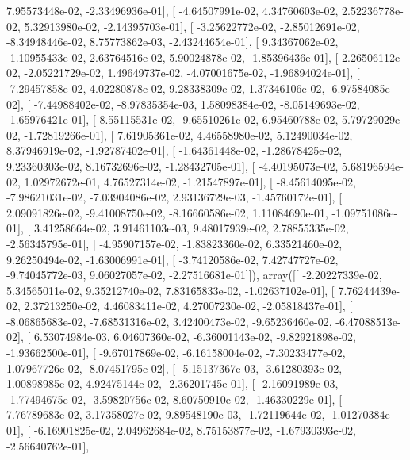 \documentclass{article}
\begin{document}
          7.95573448e-02,  -2.33496936e-01],
       [ -4.64507991e-02,   4.34760603e-02,   2.52236778e-02,
          5.32913980e-02,  -2.14395703e-01],
       [ -3.25622772e-02,  -2.85012691e-02,  -8.34948446e-02,
          8.75773862e-03,  -2.43244654e-01],
       [  9.34367062e-02,  -1.10955433e-02,   2.63764516e-02,
          5.90024878e-02,  -1.85396436e-01],
       [  2.26506112e-02,  -2.05221729e-02,   1.49649737e-02,
         -4.07001675e-02,  -1.96894024e-01],
       [ -7.29457858e-02,   4.02280878e-02,   9.28338309e-02,
          1.37346106e-02,  -6.97584085e-02],
       [ -7.44988402e-02,  -8.97835354e-03,   1.58098384e-02,
         -8.05149693e-02,  -1.65976421e-01],
       [  8.55115531e-02,  -9.65510261e-02,   6.95460788e-02,
          5.79729029e-02,  -1.72819266e-01],
       [  7.61905361e-02,   4.46558980e-02,   5.12490034e-02,
          8.37946919e-02,  -1.92787402e-01],
       [ -1.64361448e-02,  -1.28678425e-02,   9.23360303e-02,
          8.16732696e-02,  -1.28432705e-01],
       [ -4.40195073e-02,   5.68196594e-02,   1.02972672e-01,
          4.76527314e-02,  -1.21547897e-01],
       [ -8.45614095e-02,  -7.98621031e-02,  -7.03904086e-02,
          2.93136729e-03,  -1.45760172e-01],
       [  2.09091826e-02,  -9.41008750e-02,  -8.16660586e-02,
          1.11084690e-01,  -1.09751086e-01],
       [  3.41258664e-02,   3.91461103e-03,   9.48017939e-02,
          2.78855335e-02,  -2.56345795e-01],
       [ -4.95907157e-02,  -1.83823360e-02,   6.33521460e-02,
          9.26250494e-02,  -1.63006991e-01],
       [ -3.74120586e-02,   7.42747727e-02,  -9.74045772e-03,
          9.06027057e-02,  -2.27516681e-01]]), array([[ -2.20227339e-02,   5.34565011e-02,   9.35212740e-02,
          7.83165833e-02,  -1.02637102e-01],
       [  7.76244439e-02,   2.37213250e-02,   4.46083411e-02,
          4.27007230e-02,  -2.05818437e-01],
       [ -8.06865683e-02,  -7.68531316e-02,   3.42400473e-02,
         -9.65236460e-02,  -6.47088513e-02],
       [  6.53074984e-03,   6.04607360e-02,  -6.36001143e-02,
         -9.82921898e-02,  -1.93662500e-01],
       [ -9.67017869e-02,  -6.16158004e-02,  -7.30233477e-02,
          1.07967726e-02,  -8.07451795e-02],
       [ -5.15137367e-03,  -3.61280393e-02,   1.00898985e-02,
          4.92475144e-02,  -2.36201745e-01],
       [ -2.16091989e-03,  -1.77494675e-02,  -3.59820756e-02,
          8.60750910e-02,  -1.46330229e-01],
       [  7.76789683e-02,   3.17358027e-02,   9.89548190e-03,
         -1.72119644e-02,  -1.01270384e-01],
       [ -6.16901825e-02,   2.04962684e-02,   8.75153877e-02,
         -1.67930393e-02,  -2.56640762e-01],
\end{document}
